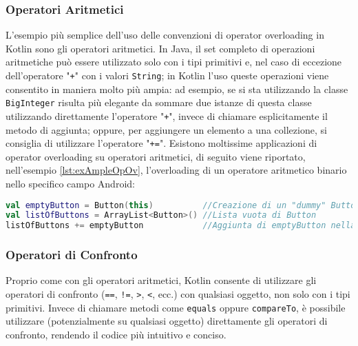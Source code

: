 \subsubsection{Operatori Aritmetici}
L'esempio più semplice dell'uso delle convenzioni di operator overloading in Kotlin sono gli operatori aritmetici. In Java, il set completo di operazioni aritmetiche può essere utilizzato solo con i tipi primitivi e, nel caso di eccezione dell'operatore "\texttt{+}" con i valori \texttt{String}; in Kotlin l'uso queste operazioni viene consentito in maniera molto più ampia: ad esempio, se si sta utilizzando la classe \texttt{BigInteger} risulta più elegante da sommare due istanze di questa classe utilizzando direttamente l'operatore "\texttt{+}", invece di chiamare esplicitamente il metodo di aggiunta; oppure, per aggiungere un elemento a una collezione, si consiglia di utilizzare l'operatore "\texttt{+=}". Esistono moltissime applicazioni di operator overloading su operatori aritmetici, di seguito viene riportato, nell'esempio \ref{lst:exAmpleOpOv}, l'overloading di un operatore aritmetico binario nello specifico campo Android:\\

\begin{lstlisting}[caption={Operatore aritmeticos su una lista}, captionpos=b, label={lst:exAmpleOpOv}, language=Kotlin]
val emptyButton = Button(this)	        //Creazione di un "dummy" Button
val listOfButtons = ArrayList<Button>() //Lista vuota di Button
listOfButtons += emptyButton            //Aggiunta di emptyButton nella lista
\end{lstlisting}

\subsubsection{Operatori di Confronto}
Proprio come con gli operatori aritmetici, Kotlin consente di utilizzare gli operatori di confronto (\texttt{==}, \texttt{!=}, \texttt{>}, \texttt{<}, ecc.) con qualsiasi oggetto, non solo con i tipi primitivi. Invece di chiamare metodi come \texttt{equals} oppure \texttt{compareTo}, è possibile utilizzare (potenzialmente su qualsiasi oggetto) direttamente gli operatori di confronto, rendendo il codice più intuitivo e conciso.\\

